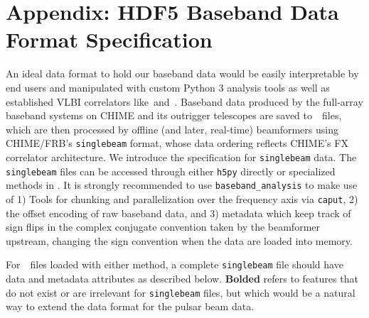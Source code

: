 \section{Appendix: HDF5 Baseband Data Format Specification}
An ideal data format to hold our baseband data would be easily interpretable by end users and manipulated with custom Python 3 analysis tools as well as established VLBI correlators like~\difx and~\sfxc. Baseband data produced by the full-array baseband systems on CHIME and its outrigger telescopes are saved to~\hdf~files, which are then processed by offline (and later, real-time) beamformers using CHIME/FRB's \texttt{singlebeam} format, whose data ordering reflects CHIME's FX correlator architecture. We introduce the specification for \texttt{singlebeam} data. The \texttt{singlebeam} files can be accessed through either \texttt{h5py} directly or specialized methods in \bba. It is strongly recommended to use \texttt{baseband\_analysis} to make use of 1) Tools for chunking and parallelization over the frequency axis via \texttt{caput}, 2) the offset encoding
of raw baseband data, and 3) metadata which keep track of sign flips in the complex conjugate convention taken by the beamformer upstream, changing the sign convention when the data are loaded into memory.

For~\hdf~files loaded with either method, a complete \texttt{singlebeam} file should have data and metadata attributes as described below. \textbf{Bolded} refers to features that do not exist or are irrelevant for \texttt{singlebeam} files, but which would be a natural way to extend the data format for the pulsar beam data. %


